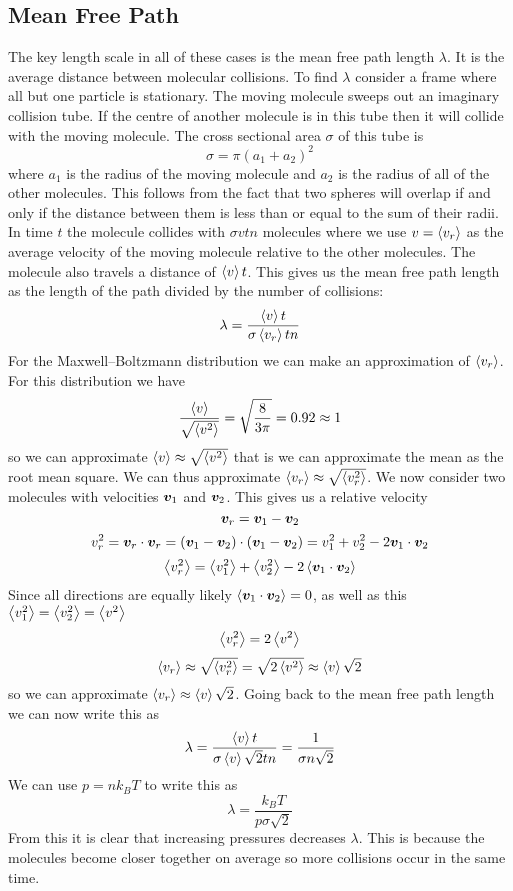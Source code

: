\documentclass{article}
\begin{document}
    \subsection{Mean Free Path}
    The key length scale in all of these cases is the mean free path length \(\lambda\).
    It is the average distance between molecular collisions.
    To find \(\lambda\) consider a frame where all but one particle is stationary.
    The moving molecule sweeps out an imaginary collision tube.
    If the centre of another molecule is in this tube then it will collide with the moving molecule.
    The cross sectional area \(\sigma\) of this tube is
    \[\sigma = \pi(a_1 + a_2)^2\]
    where \(a_1\) is the radius of the moving molecule and \(a_2\) is the radius of all of the other molecules.
    This follows from the fact that two spheres will overlap if and only if the distance between them is less than or equal to the sum of their radii.
    In time \(t\) the molecule collides with \(\sigma v tn\) molecules where we use \(v = \left\langle{v_r}\right\rangle\) as the average velocity of the moving molecule relative to the other molecules.
    The molecule also travels a distance of \(\left\langle{v}\right\rangle t\).
    This gives us the mean free path length as the length of the path divided by the number of collisions:
    \[\lambda = \frac{\left\langle{v}\right\rangle t}{\sigma\left\langle{v_r}\right\rangle tn}\]
    For the Maxwell--Boltzmann distribution we can make an approximation of \(\left\langle{v_r}\right\rangle\).
    For this distribution we have
    \[\frac{\left\langle{v}\right\rangle}{\sqrt{\left\langle{v^2}\right\rangle}} = \sqrt{\frac{8}{3\pi}} = 0.92 \approx 1\]
    so we can approximate \(\left\langle{v}\right\rangle \approx \sqrt{\left\langle{v^2}\right\rangle}\) that is we can approximate the mean as the root mean square.
    We can thus approximate \(\left\langle{v_r}\right\rangle \approx \sqrt{\left\langle{v_r^2}\right\rangle}\).
    We now consider two molecules with velocities \(\bm{v}_1\) and \(\bm{v}_2\).
    This gives us a relative velocity
    \[\bm{v}_r = \bm{v}_1 - \bm{v}_2\]
    \[v_r^2 = \bm{v}_r\cdot\bm{v}_r = (\bm{v}_1 - \bm{v}_2)\cdot(\bm{v}_1 - \bm{v}_2) = v_1^2 + v_2^2 - 2\bm{v}_1\cdot\bm{v}_2\]
    \[\left\langle{v_r^2}\right\rangle = \left\langle{v_1^2}\right\rangle + \left\langle{v_2^2}\right\rangle - 2\left\langle{\bm{v}_1\cdot\bm{v}_2}\right\rangle\]
    Since all directions are equally likely \(\left\langle{\bm{v}_1\cdot\bm{v}_2}\right\rangle = 0\), as well as this \(\left\langle{v_1^2}\right\rangle = \left\langle{v_2^2}\right\rangle = \left\langle{v^2}\right\rangle\)
    \[\left\langle{v_r^2}\right\rangle = 2\left\langle{v^2}\right\rangle\]
    \[\left\langle{v_r}\right\rangle\approx\sqrt{\left\langle{v_r^2}\right\rangle} = \sqrt{2\left\langle{v^2}\right\rangle}\approx\left\langle{v}\right\rangle\sqrt{2}\]
    so we can approximate \(\left\langle{v_r}\right\rangle\approx\left\langle{v}\right\rangle\sqrt{2}\).
    Going back to the mean free path length we can now write this as
    \[\lambda = \frac{\left\langle{v}\right\rangle t}{\sigma\left\langle{v}\right\rangle\sqrt{2}tn} = \frac{1}{\sigma n\sqrt{2}}\]
    We can use \(p = nk_BT\) to write this as
    \[\lambda = \frac{k_BT}{p\sigma\sqrt{2}}\]
    From this it is clear that increasing pressures decreases \(\lambda\).
    This is because the molecules become closer together on average so more collisions occur in the same time.
    
\end{document}
